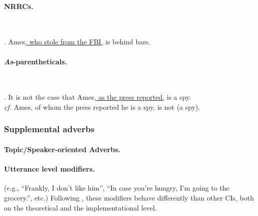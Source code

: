 \paragraph{NRRCs.}~

\noindent\parbox[b]{\textwidth}{
\ex. Ames\underline{, who stole from the FBI,} is behind bars.\\

}

\paragraph{\textit{As}-parentheticals.}~

\noindent\parbox[b]{\textwidth}{
\ex. It is not the case that Ames\underline{, as the press reported,} is
a spy.\\
\textit{cf.} Ames, of whom the press reported he is a spy, is not (a spy).\\

}
%
%
%
%
\subsubsection{Supplemental adverbs}

\paragraph{Topic/Speaker-oriented Adverbs.}


\paragraph{Utterance level modifiers.} (e.g., ``Frankly, I don't like him'',
``In case you're hungry, I'm going to the grocery.'', etc.) Following
\citet[pp.725-729]{amaral2007review}, these modifiers behave differently
than other CIs, both on the theoretical and the implementational level.


%

